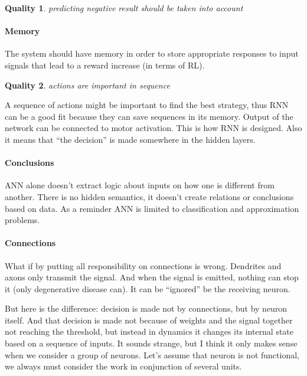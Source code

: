 \documentclass{article}
\newtheorem{Qual}{Quality}
\begin{document}
\begin{Qual}\label{q2}
  predicting negative result should be taken into account
\end{Qual}

\paragraph{Memory}

The system should have memory in order to store appropriate responses to input signals that lead to a reward increase (in terms of RL).

\begin{Qual}\label{q3}
  actions are important in sequence
\end{Qual}

A sequence of actions might be important to find the best strategy, thus RNN can be a good fit because they can save sequences in its memory. Output of the network can be connected to motor activation. This is how RNN is designed. Also it means that “the decision” is made somewhere in the hidden layers. 



\paragraph{Conclusions}
ANN alone doesn’t extract logic about inputs on how one is different from another. There is no hidden semantics, it doesn’t create relations or conclusions based on data. As a reminder ANN is limited to classification and approximation problems.



\paragraph{Connections}
What if by putting all responsibility on connections is wrong. Dendrites and axons only transmit the signal. And when the signal is emitted, nothing can stop it (only degenerative disease can). It can be “ignored” be the receiving neuron.

But here is the difference: decision is made not by connections, but by neuron itself. And that decision is made not because of weights and the signal together not reaching the threshold, but instead in dynamics it changes its internal state based on a sequence of inputs. It sounds strange, but I think it only makes sense when we consider a group of neurons. Let’s assume that neuron is not functional, we always must consider the work in conjunction of several units. 
\end{document}
